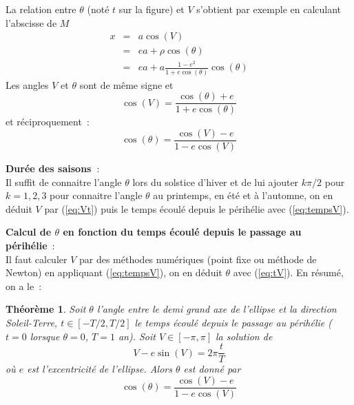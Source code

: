 \documentclass[a4paper,11pt]{article}
\newtheorem{thm}{Théorème}
\begin{document}
La relation entre $\theta$ (not\'e $t$ sur la figure)
et $V$ s'obtient par exemple en calculant 
l'abscisse de $M$ 
\begin{eqnarray*} 
x &= &a \cos(V) \\
 &= & ea + \rho \cos(\theta) \\
 &= & ea + a\frac{1-e^2}{1+e\cos(\theta)} \cos(\theta)
\end{eqnarray*}
Les angles $V$ et $\theta$ sont de même signe et
\begin{equation} \label{eq:Vt}
 \cos(V) = \frac{\cos(\theta)+e}{1+e\cos(\theta)}
\end{equation}
et réciproquement~:
\begin{equation} \label{eq:tV}
 \cos(\theta)=\frac{\cos(V)-e}{1-e \cos(V)} 
\end{equation}

{\bf Durée des saisons~}:\\
Il suffit de connaitre l'angle $\theta$ lors du solstice d'hiver et
de lui ajouter $k\pi/2$ pour $k=1,2,3$ pour connaitre l'angle $\theta$
au printemps, en été et à l'automne, on en déduit $V$ par (\ref{eq:Vt}) 
puis le temps écoulé depuis le p\'erihélie avec (\ref{eq:tempsV}).

{\bf Calcul de $\theta$ en fonction du temps écoulé depuis le passage
au p\'erihélie}~:\\
Il faut calculer $V$ par des méthodes numériques (point fixe ou 
méthode de Newton) en appliquant (\ref{eq:tempsV}), on en déduit
$\theta$ avec (\ref{eq:tV}).
En résumé, on a le~:
\begin{thm}
Soit $\theta$ l'angle entre le demi grand axe de l'ellipse et 
la direction Soleil-Terre, $t\in [-T/2,T/2]$ le temps écoulé depuis le passage
au périhélie ($t=0$ lorsque $\theta=0$, $T=1$ an). Soit $V\in [-\pi,\pi]$ 
la solution de 
\[  V - e \sin(V) = 2\pi \frac{t}{T} \]
où $e$ est l'excentricité de l'ellipse.
Alors $\theta$ est donné par
\[  \cos(\theta)=\frac{\cos(V)-e}{1-e \cos(V)}  \]
\end{thm}
\end{document}
